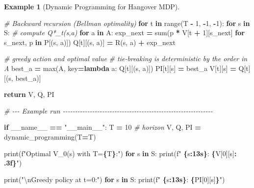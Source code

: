 \documentclass[
]{book}
\newenvironment{Shaded}{\begin{snugshade}}{\end{snugshade}}
\newcommand{\BuiltInTok}[1]{#1}
\newcommand{\CharTok}[1]{\textcolor[rgb]{0.31,0.60,0.02}{#1}}
\newcommand{\CommentTok}[1]{\textcolor[rgb]{0.56,0.35,0.01}{\textit{#1}}}
\newcommand{\ControlFlowTok}[1]{\textcolor[rgb]{0.13,0.29,0.53}{\textbf{#1}}}
\newcommand{\DecValTok}[1]{\textcolor[rgb]{0.00,0.00,0.81}{#1}}
\newcommand{\KeywordTok}[1]{\textcolor[rgb]{0.13,0.29,0.53}{\textbf{#1}}}
\newcommand{\NormalTok}[1]{#1}
\newcommand{\OperatorTok}[1]{\textcolor[rgb]{0.81,0.36,0.00}{\textbf{#1}}}
\newcommand{\SpecialCharTok}[1]{\textcolor[rgb]{0.81,0.36,0.00}{\textbf{#1}}}
\newcommand{\SpecialStringTok}[1]{\textcolor[rgb]{0.31,0.60,0.02}{#1}}
\newcommand{\StringTok}[1]{\textcolor[rgb]{0.31,0.60,0.02}{#1}}
\newcommand{\VariableTok}[1]{\textcolor[rgb]{0.00,0.00,0.00}{#1}}
\theoremstyle{definition}
\theoremstyle{definition}
\newtheorem{example}{Example}[chapter]
\theoremstyle{definition}
\theoremstyle{definition}
\theoremstyle{remark}
\begin{document}
\begin{example}[Dynamic Programming for Hangover MDP]
\begin{Shaded}
\begin{Highlighting}[]
    \CommentTok{\# Backward recursion (Bellman optimality)}
    \ControlFlowTok{for}\NormalTok{ t }\KeywordTok{in} \BuiltInTok{range}\NormalTok{(T }\OperatorTok{{-}} \DecValTok{1}\NormalTok{, }\OperatorTok{{-}}\DecValTok{1}\NormalTok{, }\OperatorTok{{-}}\DecValTok{1}\NormalTok{):}
        \ControlFlowTok{for}\NormalTok{ s }\KeywordTok{in}\NormalTok{ S:}
            \CommentTok{\# compute Q*\_t(s,a)}
            \ControlFlowTok{for}\NormalTok{ a }\KeywordTok{in}\NormalTok{ A:}
\NormalTok{                exp\_next }\OperatorTok{=} \BuiltInTok{sum}\NormalTok{(p }\OperatorTok{*}\NormalTok{ V[t }\OperatorTok{+} \DecValTok{1}\NormalTok{][s\_next] }\ControlFlowTok{for}\NormalTok{ s\_next, p }\KeywordTok{in}\NormalTok{ P[(s, a)])}
\NormalTok{                Q[t][(s, a)] }\OperatorTok{=}\NormalTok{ R(s, a) }\OperatorTok{+}\NormalTok{ exp\_next}

            \CommentTok{\# greedy action and optimal value}
            \CommentTok{\# tie{-}breaking is deterministic by the order in A}
\NormalTok{            best\_a }\OperatorTok{=} \BuiltInTok{max}\NormalTok{(A, key}\OperatorTok{=}\KeywordTok{lambda}\NormalTok{ a: Q[t][(s, a)])}
\NormalTok{            PI[t][s] }\OperatorTok{=}\NormalTok{ best\_a}
\NormalTok{            V[t][s] }\OperatorTok{=}\NormalTok{ Q[t][(s, best\_a)]}

    \ControlFlowTok{return}\NormalTok{ V, Q, PI}

\CommentTok{\# {-}{-}{-} Example run {-}{-}{-}{-}{-}{-}{-}{-}{-}{-}{-}{-}{-}{-}{-}{-}{-}{-}{-}{-}{-}{-}{-}{-}{-}{-}{-}{-}{-}{-}{-}{-}{-}{-}{-}{-}{-}{-}{-}{-}{-}{-}{-}{-}{-}{-}{-}{-}{-}{-}{-}{-}{-}{-}{-}{-}{-}{-}{-}{-}{-}}

\ControlFlowTok{if} \VariableTok{\_\_name\_\_} \OperatorTok{==} \StringTok{"\_\_main\_\_"}\NormalTok{:}
\NormalTok{    T }\OperatorTok{=} \DecValTok{10}  \CommentTok{\# horizon}
\NormalTok{    V, Q, PI }\OperatorTok{=}\NormalTok{ dynamic\_programming(T}\OperatorTok{=}\NormalTok{T)}

    \BuiltInTok{print}\NormalTok{(}\SpecialStringTok{f"Optimal V\_0(s) with T=}\SpecialCharTok{\{}\NormalTok{T}\SpecialCharTok{\}}\SpecialStringTok{:"}\NormalTok{)}
    \ControlFlowTok{for}\NormalTok{ s }\KeywordTok{in}\NormalTok{ S:}
        \BuiltInTok{print}\NormalTok{(}\SpecialStringTok{f"  }\SpecialCharTok{\{}\NormalTok{s}\SpecialCharTok{:13s\}}\SpecialStringTok{: }\SpecialCharTok{\{}\NormalTok{V[}\DecValTok{0}\NormalTok{][s]}\SpecialCharTok{: .3f\}}\SpecialStringTok{"}\NormalTok{)}

    \BuiltInTok{print}\NormalTok{(}\StringTok{"}\CharTok{\textbackslash{}n}\StringTok{Greedy policy at t=0:"}\NormalTok{)}
    \ControlFlowTok{for}\NormalTok{ s }\KeywordTok{in}\NormalTok{ S:}
        \BuiltInTok{print}\NormalTok{(}\SpecialStringTok{f"  }\SpecialCharTok{\{}\NormalTok{s}\SpecialCharTok{:13s\}}\SpecialStringTok{: }\SpecialCharTok{\{}\NormalTok{PI[}\DecValTok{0}\NormalTok{][s]}\SpecialCharTok{\}}\SpecialStringTok{"}\NormalTok{)}


\end{Highlighting}
\end{Shaded}
\end{example}
\end{document}
